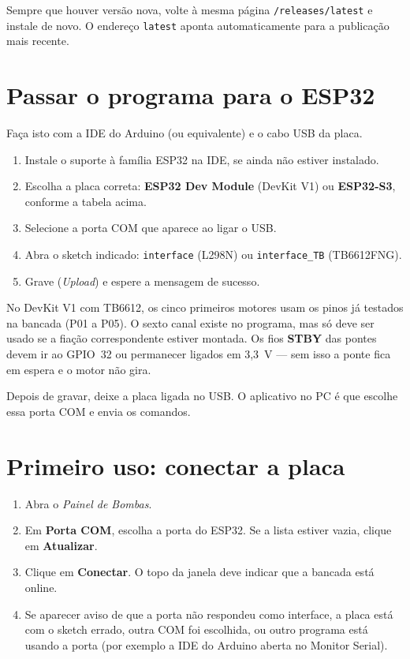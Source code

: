 \documentclass[11pt,a4paper]{article}
\newcommand{\app}{\emph{Painel de Bombas}}
\begin{document}
Sempre que houver versão nova, volte à mesma página \texttt{/releases/latest} e instale de novo. O endereço \texttt{latest} aponta automaticamente para a publicação mais recente.

\section{Passar o programa para o ESP32}
\label{sec:firmware}

Faça isto com a IDE do Arduino (ou equivalente) e o cabo USB da placa.

\begin{enumerate}
  \item Instale o suporte à família ESP32 na IDE, se ainda não estiver instalado.
  \item Escolha a placa correta: \textbf{ESP32 Dev Module} (DevKit V1) ou \textbf{ESP32-S3}, conforme a tabela acima.
  \item Selecione a porta COM que aparece ao ligar o USB.
  \item Abra o sketch indicado: \texttt{interface} (L298N) ou \texttt{interface\_TB} (TB6612FNG).
  \item Grave (\emph{Upload}) e espere a mensagem de sucesso.
\end{enumerate}

No DevKit V1 com TB6612, os cinco primeiros motores usam os pinos já testados na bancada (P01 a P05). O sexto canal existe no programa, mas só deve ser usado se a fiação correspondente estiver montada. Os fios \textbf{STBY} das pontes devem ir ao GPIO~32 ou permanecer ligados em 3,3~V --- sem isso a ponte fica em espera e o motor não gira.

Depois de gravar, deixe a placa ligada no USB. O aplicativo no PC é que escolhe essa porta COM e envia os comandos.

\section{Primeiro uso: conectar a placa}

\begin{enumerate}
  \item Abra o \app{}.
  \item Em \textbf{Porta COM}, escolha a porta do ESP32. Se a lista estiver vazia, clique em \textbf{Atualizar}.
  \item Clique em \textbf{Conectar}. O topo da janela deve indicar que a bancada está online.
  \item Se aparecer aviso de que a porta não respondeu como interface, a placa está com o sketch errado, outra COM foi escolhida, ou outro programa está usando a porta (por exemplo a IDE do Arduino aberta no Monitor Serial).
\end{enumerate}
\end{document}
